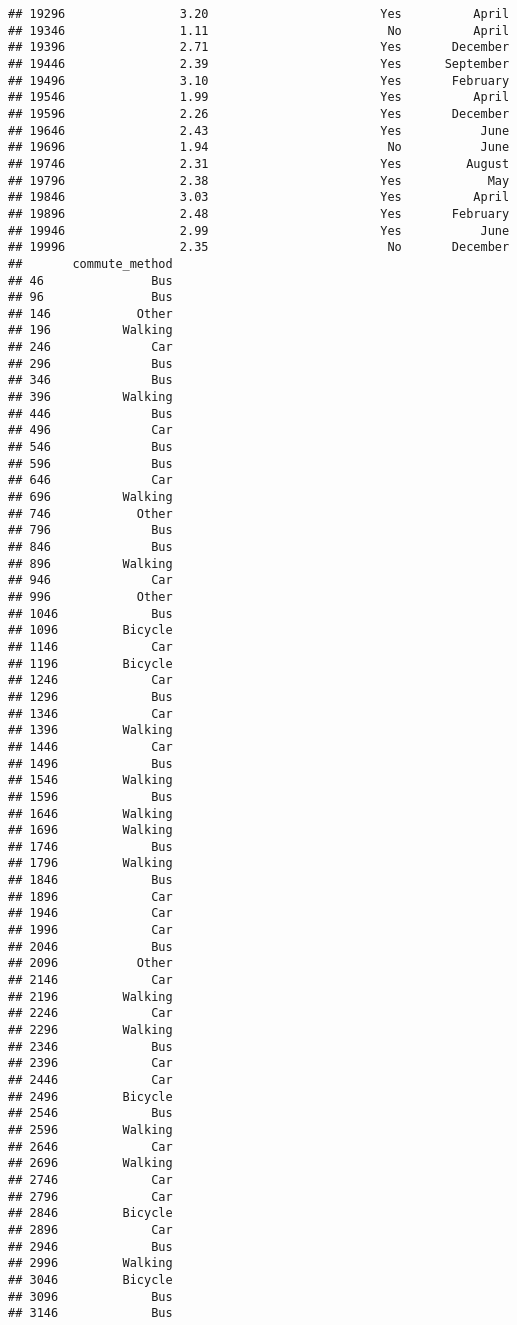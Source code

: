 \documentclass[
]{article}
\begin{document}
\begin{verbatim}
## 19296                3.20                        Yes          April
## 19346                1.11                         No          April
## 19396                2.71                        Yes       December
## 19446                2.39                        Yes      September
## 19496                3.10                        Yes       February
## 19546                1.99                        Yes          April
## 19596                2.26                        Yes       December
## 19646                2.43                        Yes           June
## 19696                1.94                         No           June
## 19746                2.31                        Yes         August
## 19796                2.38                        Yes            May
## 19846                3.03                        Yes          April
## 19896                2.48                        Yes       February
## 19946                2.99                        Yes           June
## 19996                2.35                         No       December
##       commute_method
## 46               Bus
## 96               Bus
## 146            Other
## 196          Walking
## 246              Car
## 296              Bus
## 346              Bus
## 396          Walking
## 446              Bus
## 496              Car
## 546              Bus
## 596              Bus
## 646              Car
## 696          Walking
## 746            Other
## 796              Bus
## 846              Bus
## 896          Walking
## 946              Car
## 996            Other
## 1046             Bus
## 1096         Bicycle
## 1146             Car
## 1196         Bicycle
## 1246             Car
## 1296             Bus
## 1346             Car
## 1396         Walking
## 1446             Car
## 1496             Bus
## 1546         Walking
## 1596             Bus
## 1646         Walking
## 1696         Walking
## 1746             Bus
## 1796         Walking
## 1846             Bus
## 1896             Car
## 1946             Car
## 1996             Car
## 2046             Bus
## 2096           Other
## 2146             Car
## 2196         Walking
## 2246             Car
## 2296         Walking
## 2346             Bus
## 2396             Car
## 2446             Car
## 2496         Bicycle
## 2546             Bus
## 2596         Walking
## 2646             Car
## 2696         Walking
## 2746             Car
## 2796             Car
## 2846         Bicycle
## 2896             Car
## 2946             Bus
## 2996         Walking
## 3046         Bicycle
## 3096             Bus
## 3146             Bus

\end{verbatim}
\end{document}
